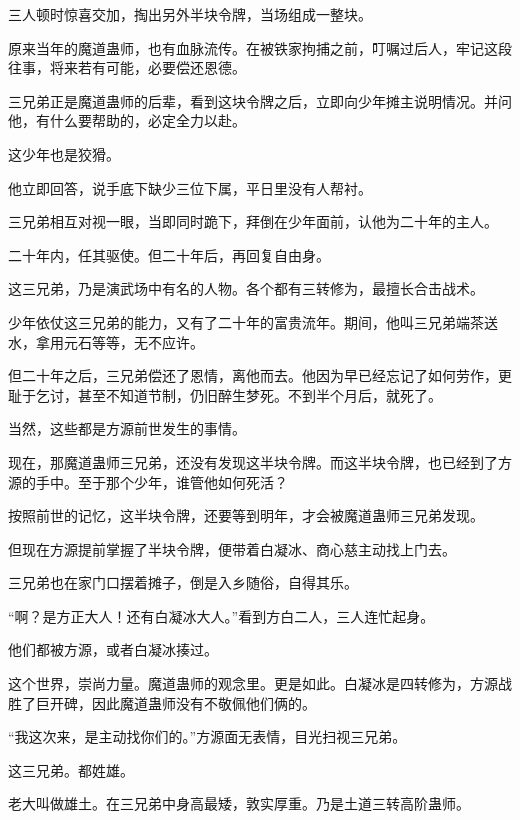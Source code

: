 
\begin{this_body}



三人顿时惊喜交加，掏出另外半块令牌，当场组成一整块。

原来当年的魔道蛊师，也有血脉流传。在被铁家拘捕之前，叮嘱过后人，牢记这段往事，将来若有可能，必要偿还恩德。

三兄弟正是魔道蛊师的后辈，看到这块令牌之后，立即向少年摊主说明情况。并问他，有什么要帮助的，必定全力以赴。

这少年也是狡猾。

他立即回答，说手底下缺少三位下属，平日里没有人帮衬。

三兄弟相互对视一眼，当即同时跪下，拜倒在少年面前，认他为二十年的主人。

二十年内，任其驱使。但二十年后，再回复自由身。

这三兄弟，乃是演武场中有名的人物。各个都有三转修为，最擅长合击战术。

少年依仗这三兄弟的能力，又有了二十年的富贵流年。期间，他叫三兄弟端茶送水，拿用元石等等，无不应许。

但二十年之后，三兄弟偿还了恩情，离他而去。他因为早已经忘记了如何劳作，更耻于乞讨，甚至不知道节制，仍旧醉生梦死。不到半个月后，就死了。

当然，这些都是方源前世发生的事情。

现在，那魔道蛊师三兄弟，还没有发现这半块令牌。而这半块令牌，也已经到了方源的手中。至于那个少年，谁管他如何死活？

按照前世的记忆，这半块令牌，还要等到明年，才会被魔道蛊师三兄弟发现。

但现在方源提前掌握了半块令牌，便带着白凝冰、商心慈主动找上门去。

三兄弟也在家门口摆着摊子，倒是入乡随俗，自得其乐。

“啊？是方正大人！还有白凝冰大人。”看到方白二人，三人连忙起身。

他们都被方源，或者白凝冰揍过。

这个世界，崇尚力量。魔道蛊师的观念里。更是如此。白凝冰是四转修为，方源战胜了巨开碑，因此魔道蛊师没有不敬佩他们俩的。

“我这次来，是主动找你们的。”方源面无表情，目光扫视三兄弟。

这三兄弟。都姓雄。

老大叫做雄土。在三兄弟中身高最矮，敦实厚重。乃是土道三转高阶蛊师。


\end{this_body}
